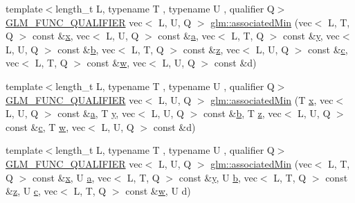 \begin{DoxyCompactItemize}
\item 
{\footnotesize template$<$length\+\_\+t L, typename T , typename U , qualifier Q$>$ }\\\hyperlink{setup_8hpp_a33fdea6f91c5f834105f7415e2a64407}{G\+L\+M\+\_\+\+F\+U\+N\+C\+\_\+\+Q\+U\+A\+L\+I\+F\+I\+ER} vec$<$ L, U, Q $>$ \hyperlink{group__gtx__associated__min__max_ga66b08118bc88f0494bcacb7cdb940556}{glm\+::associated\+Min} (vec$<$ L, T, Q $>$ const \&\hyperlink{_s_d_l__opengl_8h_ad0e63d0edcdbd3d79554076bf309fd47}{x}, vec$<$ L, U, Q $>$ const \&\hyperlink{_s_d_l__opengl__glext_8h_a3309789fc188587d666cda5ece79cf82}{a}, vec$<$ L, T, Q $>$ const \&\hyperlink{_s_d_l__opengl_8h_a1675d9d7bb68e1657ff028643b4037e3}{y}, vec$<$ L, U, Q $>$ const \&\hyperlink{_s_d_l__opengl__glext_8h_a0f71581a41fd2264c8944126dabbd010}{b}, vec$<$ L, T, Q $>$ const \&\hyperlink{_s_d_l__opengl__glext_8h_a5e74030ebb3297ce1b37ff716fedd68f}{z}, vec$<$ L, U, Q $>$ const \&\hyperlink{_s_d_l__opengl__glext_8h_a1f2d7f8147412c43ba2303a56f97ee73}{c}, vec$<$ L, T, Q $>$ const \&\hyperlink{_s_d_l__opengl__glext_8h_a6ee8f168a7ab6785a9bb57c6715dad99}{w}, vec$<$ L, U, Q $>$ const \&d)
\item 
{\footnotesize template$<$length\+\_\+t L, typename T , typename U , qualifier Q$>$ }\\\hyperlink{setup_8hpp_a33fdea6f91c5f834105f7415e2a64407}{G\+L\+M\+\_\+\+F\+U\+N\+C\+\_\+\+Q\+U\+A\+L\+I\+F\+I\+ER} vec$<$ L, U, Q $>$ \hyperlink{group__gtx__associated__min__max_ga78c28fde1a7080fb7420bd88e68c6c68}{glm\+::associated\+Min} (T \hyperlink{_s_d_l__opengl_8h_ad0e63d0edcdbd3d79554076bf309fd47}{x}, vec$<$ L, U, Q $>$ const \&\hyperlink{_s_d_l__opengl__glext_8h_a3309789fc188587d666cda5ece79cf82}{a}, T \hyperlink{_s_d_l__opengl_8h_a1675d9d7bb68e1657ff028643b4037e3}{y}, vec$<$ L, U, Q $>$ const \&\hyperlink{_s_d_l__opengl__glext_8h_a0f71581a41fd2264c8944126dabbd010}{b}, T \hyperlink{_s_d_l__opengl__glext_8h_a5e74030ebb3297ce1b37ff716fedd68f}{z}, vec$<$ L, U, Q $>$ const \&\hyperlink{_s_d_l__opengl__glext_8h_a1f2d7f8147412c43ba2303a56f97ee73}{c}, T \hyperlink{_s_d_l__opengl__glext_8h_a6ee8f168a7ab6785a9bb57c6715dad99}{w}, vec$<$ L, U, Q $>$ const \&d)
\item 
{\footnotesize template$<$length\+\_\+t L, typename T , typename U , qualifier Q$>$ }\\\hyperlink{setup_8hpp_a33fdea6f91c5f834105f7415e2a64407}{G\+L\+M\+\_\+\+F\+U\+N\+C\+\_\+\+Q\+U\+A\+L\+I\+F\+I\+ER} vec$<$ L, U, Q $>$ \hyperlink{group__gtx__associated__min__max_ga2db7e351994baee78540a562d4bb6d3b}{glm\+::associated\+Min} (vec$<$ L, T, Q $>$ const \&\hyperlink{_s_d_l__opengl_8h_ad0e63d0edcdbd3d79554076bf309fd47}{x}, U \hyperlink{_s_d_l__opengl__glext_8h_a3309789fc188587d666cda5ece79cf82}{a}, vec$<$ L, T, Q $>$ const \&\hyperlink{_s_d_l__opengl_8h_a1675d9d7bb68e1657ff028643b4037e3}{y}, U \hyperlink{_s_d_l__opengl__glext_8h_a0f71581a41fd2264c8944126dabbd010}{b}, vec$<$ L, T, Q $>$ const \&\hyperlink{_s_d_l__opengl__glext_8h_a5e74030ebb3297ce1b37ff716fedd68f}{z}, U \hyperlink{_s_d_l__opengl__glext_8h_a1f2d7f8147412c43ba2303a56f97ee73}{c}, vec$<$ L, T, Q $>$ const \&\hyperlink{_s_d_l__opengl__glext_8h_a6ee8f168a7ab6785a9bb57c6715dad99}{w}, U d)

\end{DoxyCompactItemize}
